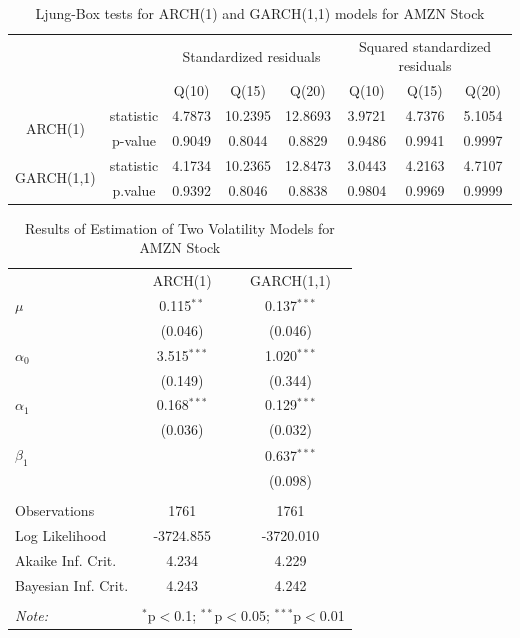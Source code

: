 \documentclass[paper=a4, fontsize=11pt]{article}
\begin{document}
\begin{table}[!htbp] \centering 
  \caption{Ljung-Box tests for ARCH(1) and GARCH(1,1) models for AMZN Stock} 
  \label{lb_AMZN} 
\begin{tabular}{cc|cccccc} 
\\[-1.8ex]\hline 
\hline
& & \multicolumn{3}{c}{Standardized residuals} & \multicolumn{3}{c}{Squared standardized residuals} \\
& & Q(10) & Q(15) & Q(20) & Q(10) & Q(15) & Q(20) \\
\hline 
\multirow{2}{*}{ARCH(1)} & statistic & 4.7873 & 10.2395 & 12.8693 & 3.9721 & 4.7376 & 5.1054 \\
& p-value & 0.9049 & 0.8044 & 0.8829 & 0.9486 & 0.9941 & 0.9997 \\
\multirow{2}{*}{GARCH(1,1)} & statistic & 4.1734 & 10.2365 & 12.8473 & 3.0443 & 4.2163 & 4.7107 \\
& p.value & 0.9392 & 0.8046 & 0.8838 & 0.9804 & 0.9969 & 0.9999 \\
\hline
\hline 
\end{tabular} 
\end{table} 

\begin{table}[!htbp] \centering 
  \caption{Results of Estimation of Two Volatility Models for AMZN Stock} 
  \label{est_AMZN} 
\begin{tabular}{@{\extracolsep{5pt}}lcc} 
\\[-1.8ex]\hline 
\hline
 & ARCH(1) & GARCH(1,1) \\ 
 $\mu$ & 0.115$^{**}$ & 0.137$^{***}$ \\ 
  & (0.046) & (0.046) \\ 
 $\alpha_0$ & 3.515$^{***}$ & 1.020$^{***}$ \\ 
  & (0.149) & (0.344) \\ 
 $\alpha_1$ & 0.168$^{***}$ & 0.129$^{***}$ \\ 
  & (0.036) & (0.032) \\ 
 $\beta_1$ &  & 0.637$^{***}$ \\ 
  &  & (0.098) \\ 
\hline \\[-1.8ex] 
Observations & 1761 & 1761 \\ 
Log Likelihood & -3724.855 & -3720.010 \\ 
Akaike Inf. Crit. & 4.234 & 4.229 \\ 
Bayesian Inf. Crit. & 4.243 & 4.242 \\ 
\hline 
\hline \\[-1.8ex] 
\textit{Note:}  & \multicolumn{2}{r}{$^{*}$p$<$0.1; $^{**}$p$<$0.05; $^{***}$p$<$0.01} \\ 
\end{tabular} 
\end{table} 
\end{document}
